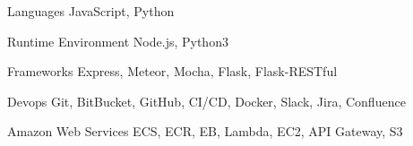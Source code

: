 
\begin{cvskills}
  \cvskill
    {Languages} %
    {JavaScript, Python} %

  \cvskill
    {Runtime Environment} %
    {Node.js, Python3} %

  \cvskill
    {Frameworks} %
    {Express, Meteor, Mocha, Flask, Flask-RESTful} %

  \cvskill
    {Devops} %
    {Git, BitBucket, GitHub, CI/CD, Docker, Slack, Jira, Confluence} %

  \cvskill
    {Amazon Web Services} %
    {ECS, ECR, EB, Lambda, EC2, API Gateway, S3} %
\end{cvskills}
